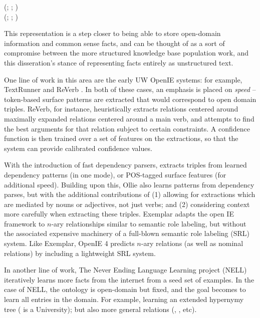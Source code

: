 \begin{displayquote}
  (; ; ) \\
  (; ; )
\end{displayquote}

This representation is a step closer to being able to store open-domain information
  and common sense facts, and can be thought of as a sort of compromise between
  the more structured knowledge base population work, and this disseration's stance
  of representing facts entirely as unstructured text.

One line of work in this area are the early UW OpenIE systems: for example,
  TextRunner \cite{key:2007yates-textrunner} and
  ReVerb \cite{key:2011fader-reverb}.
In both of these cases, an emphasis is placed on \textit{speed} --
  token-based surface patterns are extracted that would correspond to
  open domain triples.
ReVerb, for instance, heuristically extracts relations centered around maximally expanded
  relations centered around a main verb, and attempts to find the best arguments
  for that relation subject to certain constraints.
A confidence function is then trained over a set of features on the extractions, so that
  the system can provide calibrated confidence values.

With the introduction of fast dependency parsers,
  \cite{key:2010wu-openie} extracts triples from
  learned dependency patterns (in one mode), or POS-tagged surface features (for additional
  speed).
Building upon this, Ollie \cite{key:2012mausam-ollie} also learns patterns from dependency
  parses, but with the additional contributions of (1) allowing for extractions which are
  mediated by nouns or adjectives, not just verbs; and (2) considering context more carefully
  when extracting these triples.
Exemplar \cite{key:2013mesquita-exemplar} adapts the open IE framework to
  $n$-ary relationships similar to semantic role labeling, but without the
  associated expensive machinery of a full-blown semantic role labeling (SRL) system.
Like Exemplar, OpenIE 4 predicts $n$-ary relations (as well as nominal relations) by including
  a lightweight SRL system.

In another line of work, The Never Ending Language Learning project (NELL) \cite{key:2010carlson-nell}
  iteratively learns more facts from the internet
  from a seed set of examples.
In the case of NELL, the ontology is open-domain but fixed, and the goal becomes to learn
  all entries in the domain.
For example, learning an extended hypernymy tree ( is a University);
  but also more general relations (, , etc).



